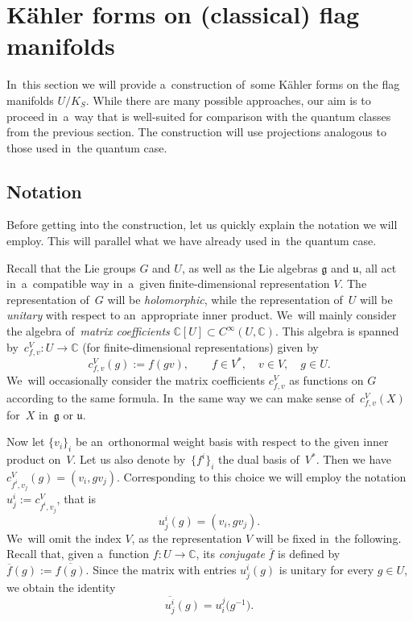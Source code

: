 \documentclass[10pt,a4paper]{amsart}
\numberwithin{equation}{section}
\newcommand{\lieg}{\mathfrak{g}}
\newcommand{\lieu}{\mathfrak{u}}
\newcommand{\CU}{\mathbb{C}[U]}
\newcommand{\bbC}{\mathbb{C}}
\begin{document}
\section{K\"ahler forms on (classical) flag manifolds}
\label{sec:kahler-forms}

In~this section we will provide a~construction of~some K\"ahler forms on the flag manifolds $U / K_S$.
While there are many possible approaches, our aim is to proceed in~a~way that is well-suited for comparison with the quantum classes from the previous section.
The construction will use projections analogous to those used in~the quantum case.

\subsection{Notation}

Before getting into the construction, let us quickly explain the notation we will employ.
This will parallel what we have already used in~the quantum case.

Recall that the Lie groups $G$ and $U$, as well as the Lie algebras $\lieg$ and $\lieu$, all act in~a~compatible way in~a~given finite-dimensional representation $V$.
The representation of~$G$ will be \emph{holomorphic}, while the representation of~$U$ will be \emph{unitary} with respect to an~appropriate inner product.
We~will mainly consider the algebra of~\emph{matrix coefficients} $\CU \subset C^\infty(U, \bbC)$.
This algebra is spanned by~$c^V_{f, v}\colon U \to \bbC$ (for finite-dimensional representations) given by
\[
c^V_{f, v}(g) := f(g v), \qquad
f \in V^*, \quad v \in V, \quad g \in U.
\]
We~will occasionally consider the matrix coefficients $c^V_{f, v}$ as functions on $G$ according to the same formula.
In~the same way we can make sense of~$c^V_{f, v}(X)$ for~$X$ in~$\lieg$ or $\lieu$.

Now let $\{v_i\}_i$ be an~orthonormal weight basis with respect to the given inner product on~$V$.
Let us also denote by~$\{f^i\}_i$ the dual basis of~$V^*$. Then we have $c^V_{f^i, v_j}(g) = (v_i, g v_j)$.
Corresponding to this choice we will employ the notation $u^i_j := c^V_{f^i, v_j}$, that is
\[
u^i_j(g) = (v_i, g v_j).
\]
We~will omit the index $V$, as the representation $V$ will be fixed in~the following.
Recall that, given a~function $f\colon U \to \bbC$, its \emph{conjugate} $\overline{f}$ is defined by~$\overline{f}(g) := \overline{f(g)}$.
Since the matrix with entries $u^i_j(g)$ is unitary for every $g \in U$, we obtain the identity
\[
\overline{u^i_j}(g) = u^j_i\big(g^{-1}\big).
\]
\end{document}

